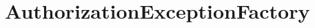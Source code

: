 \section{AuthorizationExceptionFactory}
\label{feature:AuthorizationExceptionFactory}
\ClearAPI
\TODO